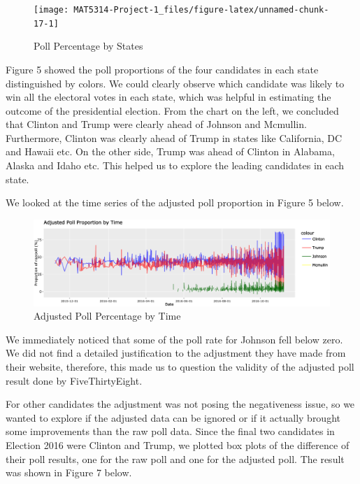 \documentclass[
  11pt,
]{article}
\begin{document}
\begin{minipage}[t]{0.7\textwidth}
\begin{figure}
\texttt{[image: MAT5314-Project-1\_files/figure-latex/unnamed-chunk-17-1]} \caption{Poll Percentage by States}\label{fig:unnamed-chunk-17}
\end{figure}
\end{minipage}
\begin{minipage}[t]{0.3\textwidth}
\vspace{0pt}
Figure 5 showed the poll proportions of the four candidates in each state distinguished by colors. We could clearly observe which candidate was likely to win all the electoral votes in each state, which was helpful in estimating the outcome of the presidential election. From the chart on the left, we concluded that Clinton and Trump were clearly ahead of Johnson and Mcmullin. Furthermore, Clinton was clearly ahead of Trump in states like California, DC and Hawaii etc. On the other side, Trump was ahead of Clinton in Alabama, Alaska and Idaho etc. This helped us to explore the leading candidates in each state.
\end{minipage}

We looked at the time series of the adjusted poll proportion in Figure 5
below.

\begin{figure}

{\centering \includegraphics{./Figures/TsChart} 

}

\caption{Adjusted Poll Percentage by Time}\label{fig:unnamed-chunk-19}
\end{figure}

We immediately noticed that some of the poll rate for Johnson fell below
zero. We did not find a detailed justification to the adjustment they
have made from their website, therefore, this made us to question the
validity of the adjusted poll result done by FiveThirtyEight.

For other candidates the adjustment was not posing the negativeness
issue, so we wanted to explore if the adjusted data can be ignored or if
it actually brought some improvements than the raw poll data. Since the
final two candidates in Election 2016 were Clinton and Trump, we plotted
box plots of the difference of their poll results, one for the raw poll
and one for the adjusted poll. The result was shown in Figure 7 below.
\end{document}

